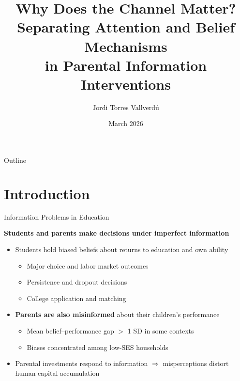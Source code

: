 \documentclass[aspectratio=169,11pt]{beamer}
\title[Information \& Parental Investment]{Why Does the Channel Matter?\\[4pt]
\small Separating Attention and Belief Mechanisms\\in Parental Information Interventions}
\author{Jordi Torres Vallverd\'{u}}
\institute{MRes TSE --- Behavioral Development Economics}
\date{March 2026}
\begin{document}
\begin{frame}
\titlepage
\end{frame}

\begin{frame}{Outline}
\tableofcontents
\end{frame}

\section{Introduction}

\begin{frame}{Information Problems in Education}

\textbf{Students and parents make decisions under imperfect information}

\begin{itemize}
    \item Students hold biased beliefs about returns to education and own ability
    \begin{itemize}
        \item Major choice and labor market outcomes \citep{arcidiacono2016college,wiswall2015determinants}
        \item Persistence and dropout decisions \citep{stinebrickner2012learning}
        \item College application and matching \citep{larroucau2024application}
    \end{itemize}

    \medskip

    \item \textbf{Parents are also misinformed} about their children's performance
    \begin{itemize}
        \item Mean belief--performance gap $>$ 1 SD in some contexts \citep{dizonross2019parents}
        \item Biases concentrated among low-SES households
    \end{itemize}

    \medskip

    \item Parental investments respond to information $\Rightarrow$ misperceptions distort human capital accumulation
\end{itemize}

\end{frame}
\end{document}
